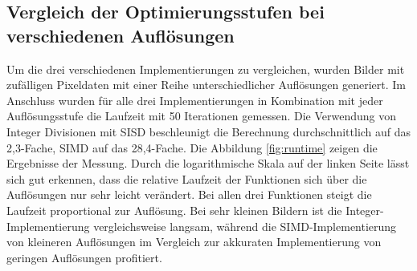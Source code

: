 \documentclass[course=erap]{aspdoc}
\begin{document}
\subsection{Vergleich der Optimierungsstufen bei verschiedenen Auflösungen}
Um die drei verschiedenen Implementierungen zu vergleichen, wurden Bilder mit zufälligen Pixeldaten mit einer Reihe unterschiedlicher Auflösungen generiert. Im Anschluss wurden für alle drei Implementierungen in Kombination mit jeder Auflösungsstufe die Laufzeit mit 50 Iterationen gemessen.
Die Verwendung von Integer Divisionen mit SISD beschleunigt die Berechnung durchschnittlich auf das 2,3-Fache, SIMD auf das 28,4-Fache. Die Abbildung \ref{fig:runtime} zeigen die Ergebnisse der Messung. Durch die logarithmische Skala auf der linken Seite lässt sich gut erkennen, dass die relative Laufzeit der Funktionen sich über die Auflösungen nur sehr leicht verändert. Bei allen drei Funktionen steigt die Laufzeit proportional zur Auflösung. Bei sehr kleinen Bildern ist die Integer-Implementierung vergleichsweise langsam, während die SIMD-Implementierung von kleineren Auflösungen im Vergleich zur akkuraten Implementierung von geringen Auflösungen profitiert. 
\end{document}
